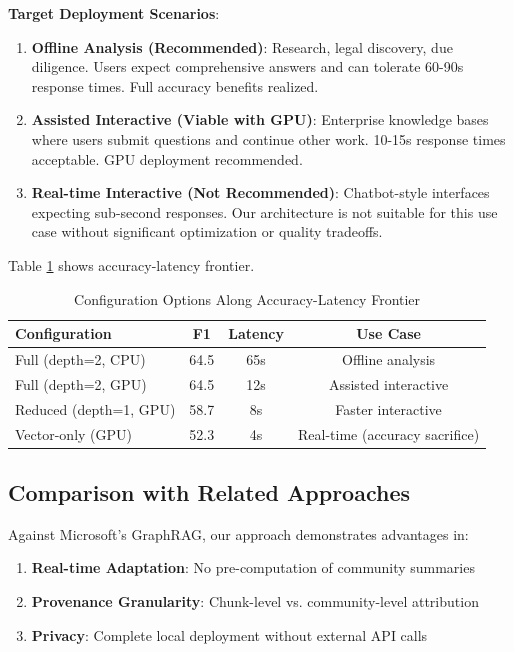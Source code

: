 \documentclass[conference]{IEEEtran}
\begin{document}
\textbf{Target Deployment Scenarios}:

\begin{enumerate}
    \item \textbf{Offline Analysis (Recommended)}: Research, legal discovery, due diligence. Users expect comprehensive answers and can tolerate 60-90s response times. Full accuracy benefits realized.
    
    \item \textbf{Assisted Interactive (Viable with GPU)}: Enterprise knowledge bases where users submit questions and continue other work. 10-15s response times acceptable. GPU deployment recommended.
    
    \item \textbf{Real-time Interactive (Not Recommended)}: Chatbot-style interfaces expecting sub-second responses. Our architecture is not suitable for this use case without significant optimization or quality tradeoffs.
\end{enumerate}

Table \ref{tab:latency} shows accuracy-latency frontier.

\begin{table}[htbp]
\caption{Configuration Options Along Accuracy-Latency Frontier}
\label{tab:latency}
\centering
\begin{tabular}{lccc}
\toprule
\textbf{Configuration} & \textbf{F1} & \textbf{Latency} & \textbf{Use Case} \\
\midrule
Full (depth=2, CPU) & 64.5 & 65s & Offline analysis \\
Full (depth=2, GPU) & 64.5 & 12s & Assisted interactive \\
Reduced (depth=1, GPU) & 58.7 & 8s & Faster interactive \\
Vector-only (GPU) & 52.3 & 4s & Real-time (accuracy sacrifice) \\
\bottomrule
\end{tabular}
\end{table}

\subsection{Comparison with Related Approaches}

Against Microsoft's GraphRAG, our approach demonstrates advantages in:
\begin{enumerate}
    \item \textbf{Real-time Adaptation}: No pre-computation of community summaries
    \item \textbf{Provenance Granularity}: Chunk-level vs. community-level attribution
    \item \textbf{Privacy}: Complete local deployment without external API calls
\end{enumerate}
\end{document}
